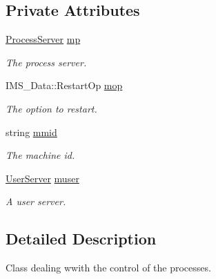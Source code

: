 \subsection*{Private Attributes}
\begin{DoxyCompactItemize}
\item 
\hypertarget{classProcessCtl_ac4f5975073ebbe6d9625be6ba27f057c}{
\hyperlink{classProcessServer}{ProcessServer} \hyperlink{classProcessCtl_ac4f5975073ebbe6d9625be6ba27f057c}{mp}}
\label{classProcessCtl_ac4f5975073ebbe6d9625be6ba27f057c}

\begin{DoxyCompactList}\small\item\em The process server. \item\end{DoxyCompactList}\item 
\hypertarget{classProcessCtl_a531924242fad8619a72927a83c9037f0}{
IMS\_\-Data::RestartOp \hyperlink{classProcessCtl_a531924242fad8619a72927a83c9037f0}{mop}}
\label{classProcessCtl_a531924242fad8619a72927a83c9037f0}

\begin{DoxyCompactList}\small\item\em The option to restart. \item\end{DoxyCompactList}\item 
\hypertarget{classProcessCtl_a3e7e5466d92085a7bc4904336f54c8dc}{
string \hyperlink{classProcessCtl_a3e7e5466d92085a7bc4904336f54c8dc}{mmid}}
\label{classProcessCtl_a3e7e5466d92085a7bc4904336f54c8dc}

\begin{DoxyCompactList}\small\item\em The machine id. \item\end{DoxyCompactList}\item 
\hypertarget{classProcessCtl_a24ace9100b5b003cea1bc22d2d7e6d54}{
\hyperlink{classUserServer}{UserServer} \hyperlink{classProcessCtl_a24ace9100b5b003cea1bc22d2d7e6d54}{muser}}
\label{classProcessCtl_a24ace9100b5b003cea1bc22d2d7e6d54}

\begin{DoxyCompactList}\small\item\em A user server. \item\end{DoxyCompactList}\end{DoxyCompactItemize}


\subsection{Detailed Description}
Class dealing wwith the control of the processes. 

